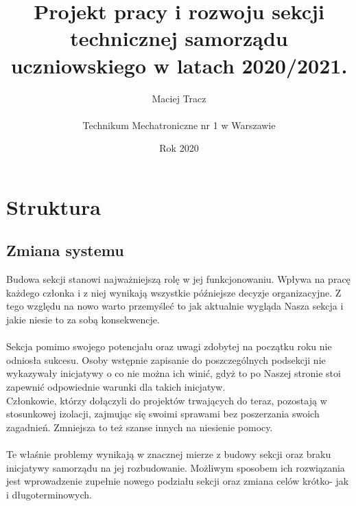 \documentclass[9pt,a4paper]{report}
\begin{document}
\title{\Huge Projekt pracy i rozwoju sekcji technicznej samorządu uczniowskiego w latach 2020/2021.}
\author{Maciej Tracz \\\\Technikum Mechatroniczne nr 1 w Warszawie}
\date{Rok 2020}
\maketitle

\newpage
\tableofcontents
\newpage

\chapter{Struktura}

\section{Zmiana systemu}
Budowa sekcji stanowi najważniejszą rolę w jej funkcjonowaniu. Wpływa na pracę każdego członka i z niej wynikają wszystkie późniejsze decyzje organizacyjne. Z tego względu na nowo warto przemyśleć to jak aktualnie wygląda Nasza sekcja i jakie niesie to za sobą konsekwencje.\\\\
Sekcja pomimo swojego potencjału oraz uwagi zdobytej na początku roku nie odniosła sukcesu. Osoby wstępnie zapisanie do poszczególnych podsekcji nie wykazywały inicjatywy o co nie można ich winić, gdyż to po Naszej stronie stoi zapewnić odpowiednie warunki dla takich inicjatyw.\\Członkowie, którzy dołączyli do projektów trwających do teraz, pozostają w stosunkowej izolacji, zajmując się swoimi sprawami bez poszerzania swoich zagadnień. Zmniejsza to też szanse innych na niesienie pomocy.\\\\
Te właśnie problemy wynikają w znacznej mierze z budowy sekcji oraz braku inicjatywy samorządu na jej rozbudowanie. Możliwym sposobem ich rozwiązania jest wprowadzenie zupełnie nowego podziału sekcji oraz zmiana celów krótko- jak i długoterminowych.\\\\
\end{document}
